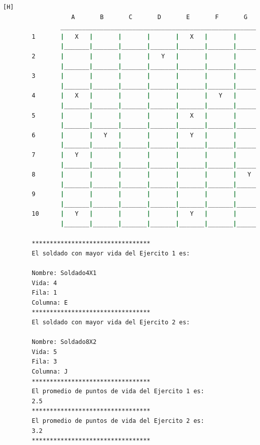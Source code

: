 \documentclass{article}
\begin{document}
\begin{lstlisting}[language=bash,caption={La ejecución: \textcolor{red}{PARA PODER VER LA TABLA COMPLETAMENTE MIRAR LA PLANTILLA DE LATEX O EJECUTARLO: }}][H]
				   A       B       C       D       E       F       G       H       I       J
				_________________________________________________________________________________
		1       |   X   |       |       |       |   X   |       |       |   X   |       |       |
				|_______|_______|_______|_______|_______|_______|_______|_______|_______|_______|
		2       |       |       |       |   Y   |       |       |       |       |       |       |
				|_______|_______|_______|_______|_______|_______|_______|_______|_______|_______|
		3       |       |       |       |       |       |       |       |       |       |   Y   |
				|_______|_______|_______|_______|_______|_______|_______|_______|_______|_______|
		4       |   X   |       |       |       |       |   Y   |       |       |       |       |
				|_______|_______|_______|_______|_______|_______|_______|_______|_______|_______|
		5       |       |       |       |       |   X   |       |       |       |       |       |
				|_______|_______|_______|_______|_______|_______|_______|_______|_______|_______|
		6       |       |   Y   |       |       |   Y   |       |       |       |       |       |
				|_______|_______|_______|_______|_______|_______|_______|_______|_______|_______|
		7       |   Y   |       |       |       |       |       |       |       |       |   X   |
				|_______|_______|_______|_______|_______|_______|_______|_______|_______|_______|
		8       |       |       |       |       |       |       |   Y   |       |       |       |
				|_______|_______|_______|_______|_______|_______|_______|_______|_______|_______|
		9       |       |       |       |       |       |       |       |       |       |       |
				|_______|_______|_______|_______|_______|_______|_______|_______|_______|_______|
		10      |   Y   |       |       |       |   Y   |       |       |   Y   |       |       |
				|_______|_______|_______|_______|_______|_______|_______|_______|_______|_______|
		
		*********************************
		El soldado con mayor vida del Ejercito 1 es: 
		
		Nombre: Soldado4X1
		Vida: 4
		Fila: 1
		Columna: E
		*********************************
		El soldado con mayor vida del Ejercito 2 es: 
		
		Nombre: Soldado8X2
		Vida: 5
		Fila: 3
		Columna: J
		*********************************
		El promedio de puntos de vida del Ejercito 1 es: 
		2.5
		*********************************
		El promedio de puntos de vida del Ejercito 2 es: 
		3.2
		*********************************
	\end{lstlisting}
\end{document}
